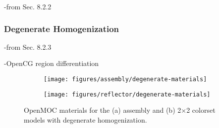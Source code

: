 -from Sec. 8.2.2

\subsubsection{Degenerate Homogenization}
\label{subsubsec:homogenize-degenerate}

-from Sec. 8.2.3

-OpenCG region differentiation~\cite{boyd2015opencg}

\begin{figure}[h!]
\centering
\begin{subfigure}{0.35\textwidth}
  \texttt{[image: figures/assembly/degenerate-materials]}
  \caption{}
  \label{fig:degenerate-assm}
\end{subfigure}
\begin{subfigure}{0.35\textwidth}
  \centering
  \texttt{[image: figures/reflector/degenerate-materials]}
  \caption{}
  \label{fig:degenerate-reflector}
\end{subfigure}
\caption{OpenMOC materials for the (a) assembly and (b) 2$\times$2 colorset models with degenerate homogenization.}
\label{fig:degenerate-geometries}
\end{figure}
